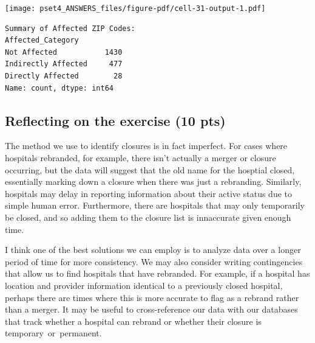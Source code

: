 \documentclass[
  letterpaper,
  DIV=11,
  numbers=noendperiod]{scrartcl}
\begin{document}
\texttt{[image: pset4\_ANSWERS\_files/figure-pdf/cell-31-output-1.pdf]}

\begin{verbatim}
Summary of Affected ZIP Codes:
Affected_Category
Not Affected           1430
Indirectly Affected     477
Directly Affected        28
Name: count, dtype: int64
\end{verbatim}

\subsection{Reflecting on the exercise (10
pts)}\label{reflecting-on-the-exercise-10-pts}

The method we use to identify closures is in fact imperfect. For cases
where hospitals rebranded, for example, there isn't actually a merger or
closure occurring, but the data will suggest that the old name for the
hosptial closed, essentially marking down a closure when there was just
a rebranding. Similarly, hospitals may delay in reporting information
about their active status due to simple human error. Furthermore, there
are hospitals that may only temporarily be closed, and so adding them to
the closure list is innaccurate given enough time.

I think one of the best solutions we can employ is to analyze data over
a longer period of time for more consistency. We may also consider
writing contingencies that allow us to find hospitals that have
rebranded. For example, if a hospital has location and provider
information identical to a previously closed hospital, perhaps there are
times where this is more accurate to flag as a rebrand rather than a
merger. It may be useful to cross-reference our data with our databases
that track whether a hospital can rebrand or whether their closure is
temporary~or~permanent.
\end{document}
